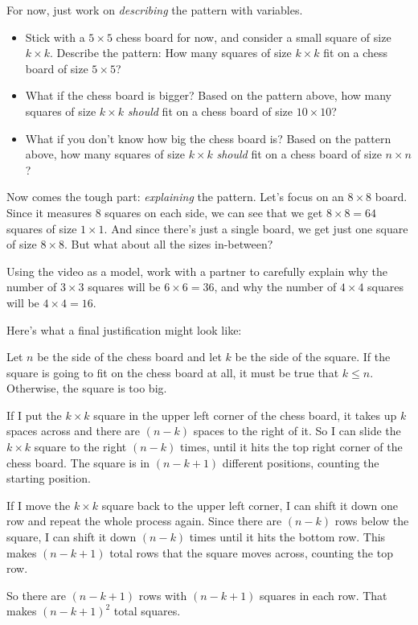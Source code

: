 \begin{thinkpair*}
For now, just work on \emph{describing} the pattern with variables.  
\begin{itemize}
\item
Stick with a $5 \times 5 $ chess board for now, and consider a small square of size $k \times k$.  Describe the pattern: How many squares of size $k \times k$ fit on a chess board of size $5\times 5$?
\item
What if the chess board is bigger?  Based on the pattern above,  how many squares of size $k \times k$ \emph{should} fit on a chess board of size $10 \times 10$?
\item
What if you don't know how big the chess board is?  Based on the pattern above,  how many squares of size $k \times k$ \emph{should} fit on a chess board of size $n \times n$?
\end{itemize}
\end{thinkpair*}

Now comes the tough part: \emph{explaining} the pattern.  Let's focus on an $8 \times 8$ board.  Since it measures $8$ squares on each side, we can see that we get $8 \times 8 = 64$ squares of size $1 \times 1$.  And since there's just a single board, we get just one square of size $8 \times 8$.  But what about all the sizes in-between?


\begin{thinkpair*}
Using the video as a model, work with a partner to carefully explain why the number of $3 \times 3$ squares will be $6 \times 6 = 36$, and why the number of $4 \times 4$ squares will be $4 \times 4 = 16$.
\end{thinkpair*} 

Here's what a final justification might look like:  

\begin{sol*}
Let $n$ be the side of the chess board and let $k$ be the side of the square.  If the square is going to fit on the chess board at all, it must be true that $k \leq n$.  Otherwise, the square is too big.

If I put the $k \times k$ square in the upper left corner of the chess board, it takes up $k$ spaces across and there are $(n-k)$ spaces to the right of it.  So I can slide the $k \times k$ square to the right $(n-k)$ times, until it hits the top right corner of the chess board.  The square is in $(n-k+1)$ different positions, counting the starting position.

If I move the $k \times k$ square back to the upper left corner, I can shift it down one row and repeat the whole process again.  Since there are $(n-k)$ rows below the square, I can shift it down $(n-k)$ times until it hits the bottom row.  This makes $(n-k+1)$ total rows that the square moves across, counting the top row.

So there are $(n-k+1)$ rows with $(n-k+1)$ squares in each row.  That makes $(n-k+1)^2$ total squares.  
\end{sol*}


